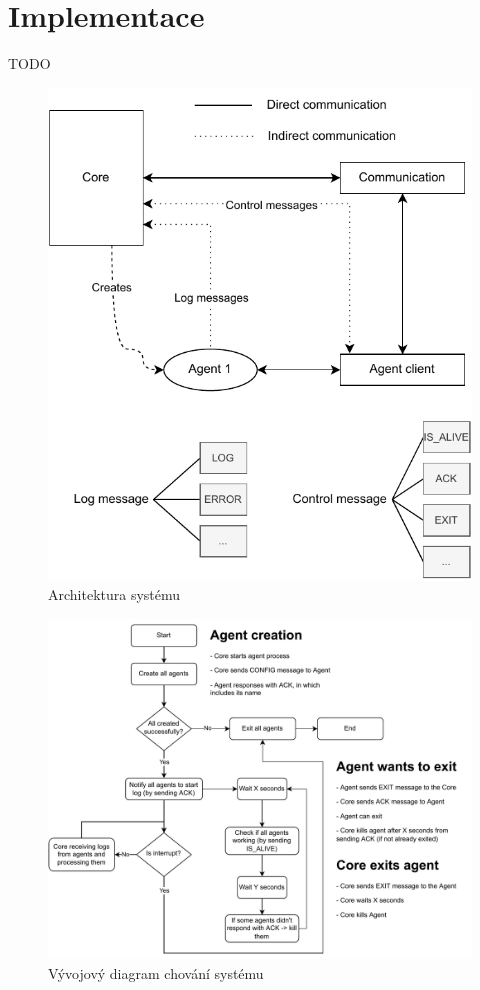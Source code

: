 \chapter{Implementace}
TODO
\begin{figure}[hbt]
	\centering
	\includegraphics[width=\textwidth]{diagrams/architecture/architecture_diagram.pdf}
	\caption{Architektura systému}
\end{figure}
\begin{figure}[hbt]
	\centering
	\includegraphics[width=\textwidth]{diagrams/flowchart/flowchart.pdf}
	\caption{Vývojový diagram chování systému}
\end{figure}
